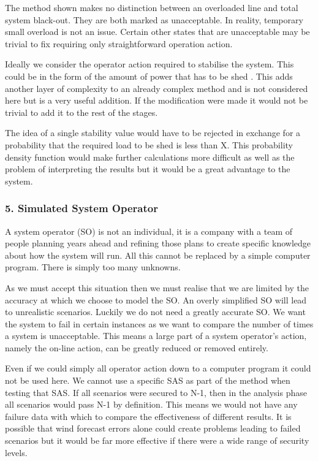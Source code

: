 \documentclass[a4paper,oneside,12pt]{report}
\begin{document}
The method shown makes no distinction between an overloaded line and total system black-out. They are both marked as unacceptable. In reality, temporary small overload is not an issue. Certain other states that are unacceptable may be trivial to fix requiring only straightforward operation action.

Ideally we consider the operator action required to stabilise the system. This could be in the form of the amount of power that has to be shed \cite{Kirschen2003}. This adds another layer of complexity to an already complex method and is not considered here but is a very useful addition. If the modification were made it would not be trivial to add it to the rest of the stages.

The idea of a single stability value would have to be rejected in exchange for a probability that the required load to be shed is less than X. This probability density function would make further calculations more difficult as well as the problem of interpreting the results but it would be a great advantage to the system.

\subsubsection{5. Simulated System Operator}

A system operator (SO) is not an individual, it is a company with a team of people planning years ahead and refining those plans to create specific knowledge about how the system will run. All this cannot be replaced by a simple computer program. There is simply too many unknowns.

As we must accept this situation then we must realise that we are limited by the accuracy at which we choose to model the SO. An overly simplified SO will lead to unrealistic scenarios. Luckily we do not need a greatly accurate SO. We want the system to fail in certain instances as we want to compare the number of times a system is unacceptable. This means a large part of a system operator's action, namely the on-line action, can be greatly reduced or removed entirely.

Even if we could simply all operator action down to a computer program it could not be used here. We cannot use a specific SAS as part of the method when testing that SAS. If all scenarios were secured to N-1, then in the analysis phase all scenarios would pass N-1 by definition. This means we would not have any failure data with which to compare the effectiveness of different results. It is possible that wind forecast errors alone could create problems leading to failed scenarios but it would be far more effective if there were a wide range of security levels.
\end{document}
